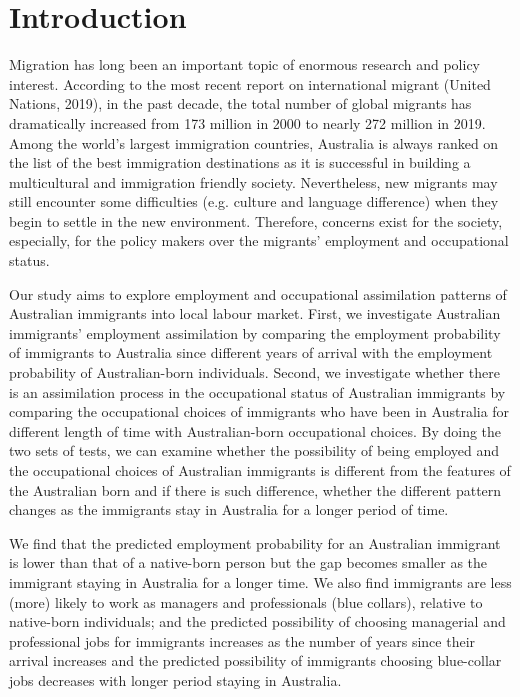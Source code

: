 
\section{Introduction}
\label{sec:Introduction}

Migration has long been an important topic of enormous research and policy interest.
According to the most recent report on international migrant (United Nations, 2019), in the past decade, the total number of global migrants has dramatically increased from 173 million in 2000 to nearly 272 million in 2019.
Among the world’s largest immigration countries, Australia is always ranked on the list of the best immigration destinations as it is successful in building a multicultural and immigration friendly society.
Nevertheless, new migrants may still encounter some difficulties (e.g. culture and language difference) when they begin to settle in the new environment.
Therefore, concerns exist for the society, especially, for the policy makers over the migrants’ employment and occupational status.

Our study aims to explore employment and occupational assimilation patterns of Australian immigrants into local labour market. 
First, we investigate Australian immigrants’ employment assimilation by comparing the employment probability of immigrants to Australia since different years of arrival with the employment probability of Australian-born individuals. 
Second, we investigate whether there is an assimilation process in the occupational status of Australian immigrants by comparing the occupational choices of immigrants who have been in Australia for different length of time with Australian-born occupational choices. 
By doing the two sets of tests, we can examine whether the possibility of being employed and the occupational choices of Australian immigrants is different from the features of the Australian born and if there is such difference, whether the different pattern changes as the immigrants stay in Australia for a longer period of time.

We find that the predicted employment probability for an Australian immigrant is lower than that of a native-born person but the gap becomes smaller as the immigrant staying in Australia for a longer time. We also find immigrants are less (more) likely to work as managers and professionals (blue collars), relative to native-born individuals; and the predicted possibility of choosing managerial and professional jobs for immigrants increases as the number of years since their arrival increases and the predicted possibility of immigrants choosing blue-collar jobs decreases with longer period staying in Australia.


